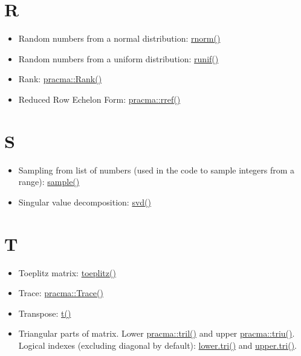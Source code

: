 \documentclass[
]{book}
\providecommand{\tightlist}{%
  \setlength{\itemsep}{0pt}\setlength{\parskip}{0pt}}
\begin{document}
\hypertarget{r}{%
\section*{R}\label{r}}

\begin{itemize}
\tightlist
\item
  Random numbers from a normal distribution: \href{https://stat.ethz.ch/R-manual/R-patched/library/stats/html/Normal.html}{rnorm()}
\item
  Random numbers from a uniform distribution: \href{https://stat.ethz.ch/R-manual/R-patched/library/stats/html/Uniform.html}{runif()}
\item
  Rank: \href{https://rdrr.io/rforge/pracma/man/rank.html}{pracma::Rank()}
\item
  Reduced Row Echelon Form: \href{https://rdrr.io/rforge/pracma/src/R/rref.R}{pracma::rref()}
\end{itemize}

\hypertarget{s}{%
\section*{S}\label{s}}

\begin{itemize}
\tightlist
\item
  Sampling from list of numbers (used in the code to sample integers from a range): \href{https://stat.ethz.ch/R-manual/R-patched/library/base/html/sample.html}{sample()}
\item
  Singular value decomposition: \href{https://stat.ethz.ch/R-manual/R-patched/library/base/html/svd.html}{svd()}
\end{itemize}

\hypertarget{t}{%
\section*{T}\label{t}}

\begin{itemize}
\tightlist
\item
  Toeplitz matrix: \href{https://stat.ethz.ch/R-manual/R-patched/library/stats/html/toeplitz.html}{toeplitz()}
\item
  Trace: \href{https://rdrr.io/rforge/pracma/man/trace.html}{pracma::Trace()}
\item
  Transpose: \href{https://stat.ethz.ch/R-manual/R-devel/library/base/html/t.html}{t()}
\item
  Triangular parts of matrix. Lower \href{https://rdrr.io/rforge/pracma/man/tri.html}{pracma::tril()} and upper \href{https://rdrr.io/rforge/pracma/man/tri.html}{pracma::triu()}. Logical indexes (excluding diagonal by default): \href{https://stat.ethz.ch/R-manual/R-patched/library/base/html/lower.tri.html}{lower.tri()} and \href{https://stat.ethz.ch/R-manual/R-patched/library/base/html/lower.tri.html}{upper.tri()}.
\end{itemize}
\end{document}
